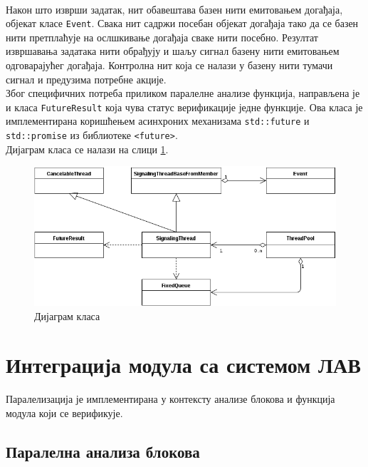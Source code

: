 \documentclass[12pt,oneside]{memoir}
\begin{document}
\\ \indent 
Након што изврши задатак, нит обавештава базен нити емитовањем догађаја, објекат класе  \texttt{Event}. Свака нит садржи посебан објекат догађаја тако да се базен нити претплаћује на ослшкивање догађаја сваке нити посебно. Резултат извршавања задатака нити обрађују и шаљу сигнал базену нити емитовањем одговарајућег догађаја. Контролна нит која се налази у базену нити тумачи сигнал и предузима потребне акције. 
\\ \indent 
Због специфичних потреба приликом паралелне анализе функција, направљена је и класа \texttt{FutureResult} која чува статус верификације једне функције. Ова класа је имплементирана коришћењем асинхроних механизама \texttt{std::future} и \texttt{std::promise} из библиотеке \texttt{<future>}.	
\\ \indent 
Дијаграм класа се налази на слици \ref{fig:klasa_dij}.
 
 
 \begin{figure}[!ht]
  \centering
  \includegraphics[]{class_diag.png}
  \caption{Дијаграм класа}
  \label{fig:klasa_dij}
\end{figure}


\section{Интеграција модула са системом ЛАВ}

Паралелизација је имплементирана у контексту анализе блокова и функција модула који се верификује. 

\subsection{Паралелна анализа блокова}
\end{document}
